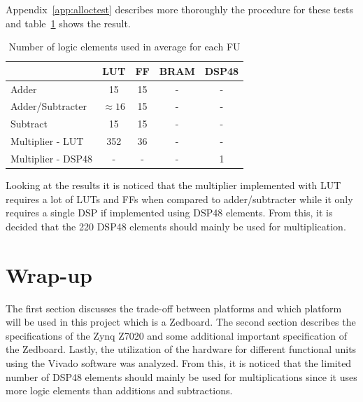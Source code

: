 Appendix~\vref{app:alloctest} describes more thoroughly the procedure for these tests and table~\ref{tab:utilizationofelements} shows the result.
\begin{table}[ht!]
\centering
\begin{tabular}{l | c c c c }
  \toprule
   &  LUT & FF & BRAM & DSP48 \\
  \midrule
  Adder & 15 & 15 & - & - \\
  Adder/Subtracter  & $\approx 16$ & 15 & - & - \\
  Subtract  & 15 &  15 & - & - \\
  Multiplier - LUT  & 352 &  36 & - & - \\
  Multiplier - DSP48 & - & - & - & 1 \\
  \bottomrule
\end{tabular}
\caption{Number of logic elements used in average for each FU}
\label{tab:utilizationofelements}
\end{table}

Looking at the results it is noticed that the multiplier implemented with LUT requires a lot of LUTs and FFs when compared to adder/subtracter while it only requires a single DSP if implemented using DSP48 elements. From this, it is decided that the 220 DSP48 elements should mainly be used for multiplication.

\section{Wrap-up}
The first section discusses the trade-off between platforms and which platform will be used in this project which is a Zedboard. The second section describes the specifications of the Zynq Z7020 and some additional important specification of the Zedboard. Lastly, the utilization of the hardware for different functional units using the Vivado software was analyzed. From this, it is noticed that the limited number of DSP48 elements should mainly be used for multiplications since it uses more logic elements than additions and subtractions. 